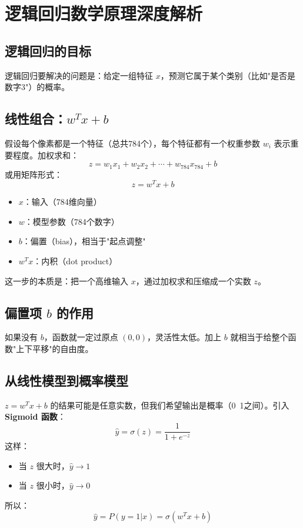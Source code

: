 \documentclass[UTF8]{ctexart}
\begin{document}
	\section{逻辑回归数学原理深度解析}
	
	\subsection{逻辑回归的目标}
	逻辑回归要解决的问题是：给定一组特征 $x$，预测它属于某个类别（比如"是否是数字3"）的概率。
	
	\subsection{线性组合：$w^T x + b$}
	假设每个像素都是一个特征（总共784个），每个特征都有一个权重参数 $w_i$ 表示重要程度。加权求和：
	\[
	z = w_1 x_1 + w_2 x_2 + \cdots + w_{784} x_{784} + b
	\]
	或用矩阵形式：
	\[
	z = w^T x + b
	\]
	
	\begin{itemize}
		\item $x$：输入（784维向量）
		\item $w$：模型参数（784个数字）
		\item $b$：偏置（bias），相当于"起点调整"
		\item $w^T x$：内积（dot product）
	\end{itemize}
	
	这一步的本质是：把一个高维输入 $x$，通过加权求和压缩成一个实数 $z$。
	
	\subsection{偏置项 $b$ 的作用}
	如果没有 $b$，函数就一定过原点 $(0,0)$，灵活性太低。加上 $b$ 就相当于给整个函数"上下平移"的自由度。
	
	\subsection{从线性模型到概率模型}
	$z = w^T x + b$ 的结果可能是任意实数，但我们希望输出是概率（0~1之间）。引入 \textbf{Sigmoid 函数}：
	\[
	\hat{y} = \sigma(z) = \frac{1}{1 + e^{-z}}
	\]
	这样：
	\begin{itemize}
		\item 当 $z$ 很大时，$\hat{y} \to 1$
		\item 当 $z$ 很小时，$\hat{y} \to 0$
	\end{itemize}
	
	所以：
	\[
	\hat{y} = P(y = 1 | x) = \sigma(w^T x + b)
	\]
	
\end{document}
